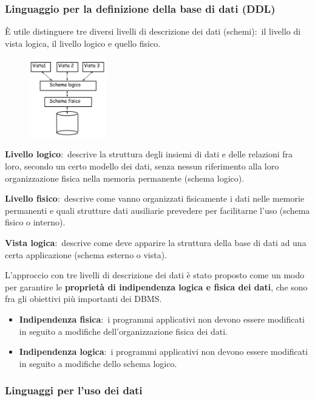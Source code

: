 \subsubsection{Linguaggio per la definizione della base di dati (DDL)}

È utile distinguere tre diversi livelli di descrizione dei dati (schemi):\ il livello di vista logica, il livello logico e quello fisico.
\begin{figure}[H]
	\centering
	\includegraphics[width=0.3\textwidth]{immagini/livelli_descrizione_dati.png}
\end{figure}
\noindent\textbf{Livello logico}:\ descrive la struttura degli insiemi di dati e delle relazioni fra loro, secondo un certo modello dei dati, senza nessun riferimento alla loro organizzazione fisica nella memoria permanente (schema logico).

\noindent\textbf{Livello fisico}:\ descrive come vanno organizzati fisicamente i dati nelle memorie permanenti e quali strutture dati ausiliarie prevedere per facilitarne l'uso (schema fisico o interno).

\noindent\textbf{Vista logica}:\ descrive come deve apparire la struttura della base di dati ad una certa applicazione (schema esterno o vista).

L'approccio con tre livelli di descrizione dei dati è stato proposto come un modo per garantire le \textbf{proprietà di indipendenza logica e fisica dei dati}, che sono fra gli obiettivi più importanti dei DBMS.
\begin{itemize}
	\item \textbf{Indipendenza fisica}:\ i programmi applicativi non devono essere modificati in seguito a modifiche dell'organizzazione fisica dei dati.
	\item \textbf{Indipendenza logica}:\ i programmi applicativi non devono essere modificati in seguito a modifiche dello schema logico.
\end{itemize}

\subsubsection{Linguaggi per l'uso dei dati}

